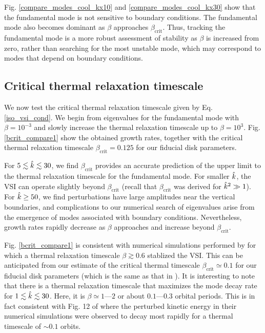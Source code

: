 Fig. \ref{compare_modes_cool_kx10} and \ref{compare_modes_cool_kx30} 
show that the fundamental mode is not sensitive to boundary
conditions. The fundamental mode also becomes dominant as $\beta$
approaches $\beta_\mathrm{crit}$. %
Thus, tracking the fundamental mode is a more robust assessment of
stability as $\beta$ is increased from zero, rather than 
searching for the most unstable mode, which may correspond to modes
that depend on boundary conditions.  

\subsection{Critical thermal relaxation
  timescale}\label{bcrit_num_test}
We now test the critical thermal relaxation timescale given by
Eq. \ref{iso_vsi_cond}. We begin from eigenvalues for the fundamental
mode with $\beta=10^{-3}$ and slowly increase the thermal
relaxation timescale up to $\beta=10^3$. Fig. \ref{bcrit_compare1}
show the obtained growth rates, together with the critical  
thermal relaxation timescale $\beta_\mathrm{crit}=0.125$ for our
fiducial disk parameters.   

For $5\lesssim\hat{k}\lesssim30$, we find $\beta_\mathrm{crit}$ provides
an accurate prediction of the upper limit to the thermal relaxation 
timescale for the fundamental mode. For smaller $\hat{k}$, the VSI can
operate slightly beyond $\beta_\mathrm{crit}$ (recall that
$\beta_\mathrm{crit}$ was derived for $\hat{k}^2\gg 1$). For
$\hat{k}\geq 50$, we find perturbations have large amplitudes near the
 vertical boundaries, and 
complications to our numerical search of
eigenvalues arise from the emergence of modes associated with boundary
conditions. %
Nevertheless, growth rates rapidly decrease as $\beta$
approaches and increase beyond $\beta_\mathrm{crit}$.  

Fig. \ref{bcrit_compare1} is consistent with numerical simulations
performed by \cite{nelson13} for which a thermal relaxation timescale
$\beta\gtrsim 0.6$ stablized the VSI. This can be anticipated from our
estimate of the critical thermal timescale $\beta_\mathrm{crit}\simeq
0.1$ for our fiducial disk parameters (which is the same as that in
\citeauthor{nelson13}). It is interesting to note that there is a
thermal relaxation timescale that maximizes the mode decay rate for
$1\lesssim \hat{k} \lesssim 30$. Here, it is $\beta\simeq1$---$2$ or
about $0.1$---$0.3$ orbital periods. This is in fact consistent with 
Fig. 12 of \citeauthor{nelson13} where the perturbed kinetic energy in their
numerical simulations were observed to decay most rapidly for a
thermal timescale of $\sim 0.1$ orbits.     

